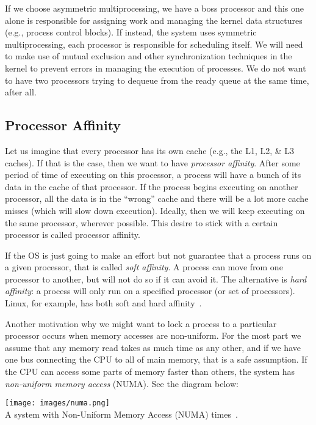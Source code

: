 If we choose asymmetric multiprocessing, we have a boss processor and this one alone is responsible for assigning work and managing the kernel data structures (e.g., process control blocks). If instead, the system uses symmetric multiprocessing, each processor is responsible for scheduling itself. We will need to make use of mutual exclusion and other synchronization techniques in the kernel to prevent errors in managing the execution of processes. We do not want to have two processors trying to dequeue from the ready queue at the same time, after all.

\subsection*{Processor Affinity}
Let us imagine that every processor has its own cache (e.g., the L1, L2, \& L3 caches). If that is the case, then we want to have \textit{processor affinity}. After some period of time of executing on this processor, a process will have a bunch of its data in the cache of that processor. If the process begins executing on another processor, all the data is in the ``wrong'' cache and there will be a lot more cache misses (which will slow down execution). Ideally, then we will keep executing on the same processor, wherever possible. This desire to stick with a certain processor is called processor affinity.

If the OS is just going to make an effort but not guarantee that a process runs on a given processor, that is called \textit{soft affinity}. A process can move from one processor to another, but will not do so if it can avoid it. The alternative is \textit{hard affinity}: a process will only run on a specified processor (or set of processors). Linux, for example, has both soft and hard affinity~\cite{osc}.

Another motivation why we might want to lock a process to a particular processor occurs when memory accesses are non-uniform. For the most part we assume that any memory read takes as much time as any other, and if we have one bus connecting the CPU to all of main memory, that is a safe assumption. If the CPU can access some parts of memory faster than others, the system has \textit{non-uniform memory access} (NUMA). See the diagram below:

\begin{center}
	\texttt{[image: images/numa.png]}\\
	A system with Non-Uniform Memory Access (NUMA) times~\cite{osc}.
\end{center}

